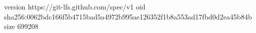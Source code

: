 version https://git-lfs.github.com/spec/v1
oid sha256:0062bdc166f5b4715bad5a4972b995ae126352f1b8a553ad17fbd0d2ea45b84b
size 699208
